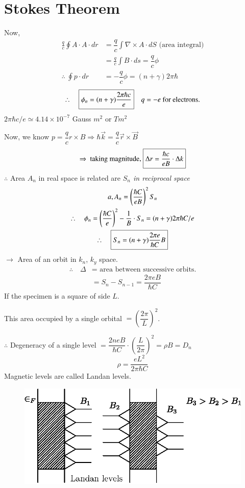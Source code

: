 \section*{Stokes Theorem}

Now,
\begin{align*}
\frac{q}{c}\oint A\cdot A\cdot dr &= \dfrac{q}{c}\int \nabla\times A\cdot dS \text{ (area integral)}\\
&= \frac{q}{c}\int B\cdot ds=\dfrac{q}{c}\phi\\
\therefore \ \oint p\cdot dr &= -\dfrac{q}{c}\phi = (n+\gamma)2\pi\hbar
\end{align*}
$$
\therefore\quad \fbox{$\phi_{n}=(n+\gamma)\dfrac{2\pi\hbar c}{e}$}\quad q=-e\text{ for electrons.}
$$
$2\pi\hbar c/e\simeq 4.14\times 10^{-7}$ Gauss $m^{2}$ or $Tm^{2}$

Now, we know  $p=\dfrac{q}{c}r\times B\Rightarrow \hbar\overrightarrow{k}=\dfrac{q}{c}\overrightarrow{r}\times \overrightarrow{B}$
$$
\Rightarrow \text{ taking magnitude, } \fbox{$\Delta r=\dfrac{\hbar c}{eB}\cdot \Delta k$}
$$
$\therefore$ Area $A_{n}$ in real space is related are {\em $S_{n}$ in reciprocal space}
\begin{gather*}
a, A_{n}=\left(\dfrac{\hbar C}{eB}\right)^{2}S_{n}\\
\therefore\quad \phi_{n}=\left(\dfrac{\hbar C}{e}\right)^{2}-\dfrac{1}{B}\cdot S_{n}=(n+\gamma)2\pi \hbar C/e\\
\therefore\quad \fbox{$S_{n}=(n+\gamma)\dfrac{2\pi e}{\hbar C}B$}
\end{gather*}
$\to$ Area of an orbit in $k_{n}$, $k_{y}$ space.
\begin{align*}
\therefore\quad \Delta &=\text{ area between successive orbits.}\\
&= S_{n}-S_{n-1}=\dfrac{2\pi eB}{\hbar C}
\end{align*}
If the specimen is a square of side $L$.

This area occupied by a single orbital $=\left(\dfrac{2\pi}{L}\right)^{2}$.

$\therefore$ Degeneracy of a single level $=\dfrac{2neB}{\hbar C}\cdot \left(\dfrac{L}{2\pi}\right)^{2}=\rho B=D_{n}$
$$
\rho=\dfrac{eL^{2}}{2\pi\hbar C}
$$
Magnetic levels are called Landan levels.
\begin{figure}[H]
\centering
\includegraphics{images/lecture24/fig12.eps}
\end{figure}

